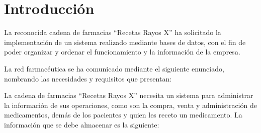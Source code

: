 \documentclass[letter,12pt]{report}
\begin{document}
\section{Introducción}
La reconocida cadena de farmacias ``Recetas Rayos X'' ha solicitado la implementación de un sistema realizado mediante bases de datos, con el fin de poder organizar y ordenar el funcionamiento y la información de la empresa.

La red farmacéutica se ha comunicado mediante el siguiente enunciado, nombrando las necesidades y requisitos que presentan:

  La cadena de farmacias ``Recetas Rayos X'' necesita un sistema para administrar la información de sus operaciones, como son la compra, venta y administración de medicamentos, demás de los pacientes y quien les receto un medicamento. La información que se debe almacenar es la siguiente:
\end{document}
